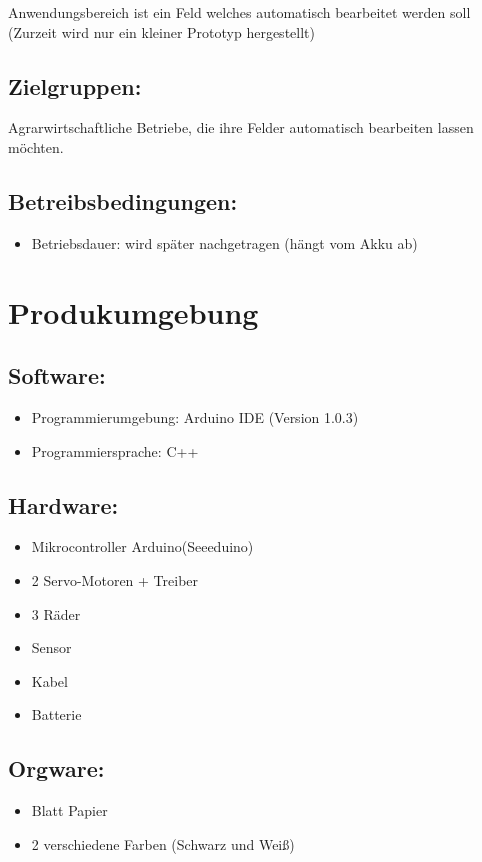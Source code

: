 \documentclass[12pt,a4paper]{article}
\begin{document}
Anwendungsbereich ist ein Feld welches automatisch bearbeitet werden soll (Zurzeit wird nur ein kleiner Prototyp hergestellt)


\subsection{ Zielgruppen:}

Agrarwirtschaftliche Betriebe, die ihre Felder automatisch bearbeiten lassen möchten.


\subsection{ Betreibsbedingungen:}
\begin{itemize}
\item Betriebsdauer: wird später nachgetragen (hängt vom Akku ab)
\end{itemize}



\section{ Produkumgebung}
\subsection{Software:}
\begin{itemize}
\item Programmierumgebung: Arduino IDE (Version 1.0.3)
\item Programmiersprache: C++
\end{itemize}
	
\subsection{Hardware:}
\begin{itemize}
\item Mikrocontroller Arduino(Seeeduino)
\item 2 Servo-Motoren + Treiber
\item 3 Räder 
\item Sensor
\item Kabel
\item Batterie
\end{itemize}

\subsection{Orgware:}
\begin{itemize}
\item Blatt Papier
\item 2 verschiedene Farben (Schwarz und Weiß)
\end{itemize}
\end{document}
